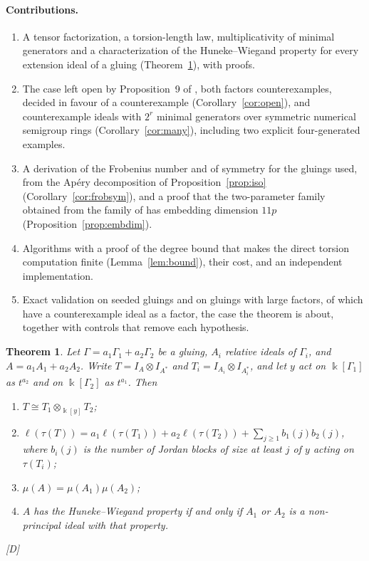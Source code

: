 \documentclass[11pt]{article}
\newtheorem{theorem}{Theorem}[section]
\theoremstyle{definition}
\theoremstyle{remark}
\newcommand{\kk}{\Bbbk}
\newcommand{\tor}{\tau}
\newcommand{\len}{\ell}
\newcommand{\mD}{\emph{[D]}}
\begin{document}
\paragraph{Contributions.}
\begin{enumerate}
\item A tensor factorization, a torsion-length law, multiplicativity of minimal generators and a characterization
of the Huneke--Wiegand property for every extension ideal of a gluing (Theorem~\ref{thm:main}), with proofs.
\item The case left open by Proposition~9 of \cite{GarciaSanchezLeamer2013}, both factors counterexamples, decided in
favour of a counterexample (Corollary~\ref{cor:open}), and counterexample ideals with $2^r$ minimal generators over
symmetric numerical semigroup rings (Corollary~\ref{cor:many}), including two explicit four-generated examples.
\item A derivation of the Frobenius number and of symmetry for the gluings used, from the Ap\'ery decomposition
of Proposition~\ref{prop:iso} (Corollary~\ref{cor:frobsym}), and a proof that the two-parameter family obtained from the
family of \cite{SantibanezLeal2026} has embedding dimension $11p$ (Proposition~\ref{prop:embdim}).
\item Algorithms with a proof of the degree bound that makes the direct torsion computation finite
(Lemma~\ref{lem:bound}), their cost, and an independent implementation.
\item Exact validation on \NSeeded{} seeded gluings and on \NHard{} gluings with large factors, \NHardCE{} of which have a counterexample
ideal as a factor, the case the theorem is about, together with controls that remove each hypothesis.
\end{enumerate}

\begin{theorem}\label{thm:main}
Let $\Gamma=a_1\Gamma_1+a_2\Gamma_2$ be a gluing, $A_i$ relative ideals of $\Gamma_i$, and
$A=a_1A_1+a_2A_2$. Write $T=I_A\otimes I_{A^*}$ and $T_i=I_{A_i}\otimes I_{A_i^*}$, and let $y$ act on
$\kk[\Gamma_1]$ as $t^{a_2}$ and on $\kk[\Gamma_2]$ as $t^{a_1}$. Then
\begin{enumerate}
\item $T\cong T_1\otimes_{\kk[y]}T_2$;
\item $\len(\tor(T))=a_1\len(\tor(T_1))+a_2\len(\tor(T_2))+\sum_{j\ge1}b_1(j)b_2(j)$, where $b_i(j)$ is
the number of Jordan blocks of size at least $j$ of $y$ acting on $\tor(T_i)$;
\item $\mu(A)=\mu(A_1)\mu(A_2)$;
\item $A$ has the Huneke--Wiegand property if and only if $A_1$ or $A_2$ is a non-principal ideal with
that property.
\end{enumerate}
\mD{}
\end{theorem}
\end{document}
